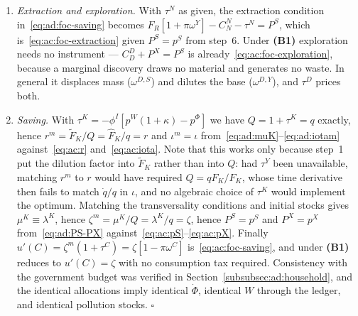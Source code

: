\begin{enumerate}[label=\arabic*.,leftmargin=2.4em]
\item \emph{Extraction and exploration.} With $\tau^N$ as given, the extraction condition in~\eqref{eq:ad:foc-saving} becomes $F_R\left[1+\pi\omega^Y\right]-C^N_N-\tau^N=P^S$, which is~\eqref{eq:ac:foc-extraction} given $P^S=p^S$ from step~6. Under \textbf{(B1)} exploration needs no instrument --- $C^D_D+P^X=P^S$ is already~\eqref{eq:ac:foc-exploration}, because a marginal discovery draws no material and generates no waste. In general it displaces mass ($\omega^{D,S}$) and dilutes the base ($\omega^{D,Y}$), and $\tau^D$ prices both.
\item \emph{Saving.} With $\tau^K=-\phi^I\left[p^W\left(1+\kappa\right)-p^\Phi\right]$ we have $Q=1+\tau^K=q$ exactly, hence $r^m=\widetilde F_K/Q=\widehat F_K/q=r$ and $\iota^m=\iota$ from~\eqref{eq:ad:muK}--\eqref{eq:ad:iotam} against~\eqref{eq:ac:r} and~\eqref{eq:ac:iota}. Note that this works only because step~1 put the dilution factor into $\widetilde F_K$ rather than into $Q$: had $\tau^Y$ been unavailable, matching $r^m$ to $r$ would have required $Q=qF_K/\widehat F_K$, whose time derivative then fails to match $\dot q/q$ in $\iota$, and no algebraic choice of $\tau^K$ would implement the optimum. Matching the transversality conditions and initial stocks gives $\mu^K\equiv\lambda^K$, hence $\zeta^m=\mu^K/Q=\lambda^K/q=\zeta$, hence $P^S=p^S$ and $P^X=p^X$ from~\eqref{eq:ad:PS-PX} against~\eqref{eq:ac:pS}--\eqref{eq:ac:pX}. Finally $u'(C)=\zeta^m\left(1+\tau^C\right)=\zeta\left[1-\pi\omega^C\right]$ is~\eqref{eq:ac:foc-saving}, and under \textbf{(B1)} reduces to $u'(C)=\zeta$ with no consumption tax required. Consistency with the government budget was verified in Section~\ref{subsubsec:ad:household}, and the identical allocations imply identical $\dot\Phi$, identical $W$ through the ledger, and identical pollution stocks. \hfill$\square$
\end{enumerate}

